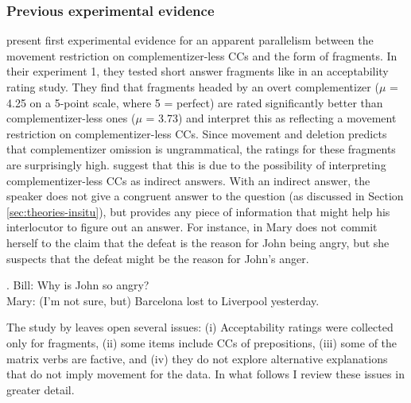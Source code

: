 \subsubsection{Previous experimental evidence}
\citet{merchant.etal2013} present first experimental evidence for an apparent parallelism between the movement restriction on complementizer-less CCs and the form of fragments. In their experiment 1, they tested short answer fragments like \Last[a] in an acceptability rating study. They find that fragments headed by an overt complementizer ($\mu$ = 4.25 on a 5-point scale, where 5 = perfect) are rated significantly better than complemen\-tizer-less ones ($\mu$  = 3.73) and interpret this as reflecting a movement restriction on comple\-mentizer-less CCs. Since movement and deletion predicts that complementizer omission is ungrammatical, the ratings for these fragments are surprisingly high. \citet{merchant.etal2013} suggest that this is due to the possibility of interpreting complementizer-less CCs as indirect answers. With an indirect answer, the speaker does not give a congruent answer to the question (as discussed in Section \ref{sec:theories-insitu}), but provides any piece of information that might help his interlocutor to figure out an answer. For instance, in \Next Mary does not commit herself to the claim that the defeat is the reason for John being angry, but she suspects that the defeat might be the reason for John's anger.

\ex. Bill: Why is John so angry?\\
    Mary: (I'm not sure, but) Barcelona lost to Liverpool yesterday.
    
The study by \citet{merchant.etal2013} leaves open several issues: (i) Acceptability ratings were collected only for fragments,  (ii) some items include CCs of prepositions, (iii) some of the matrix verbs are factive, and (iv) they do not explore alternative explanations that do not imply movement for the data. In what follows I review these issues in greater detail.\largerpage

